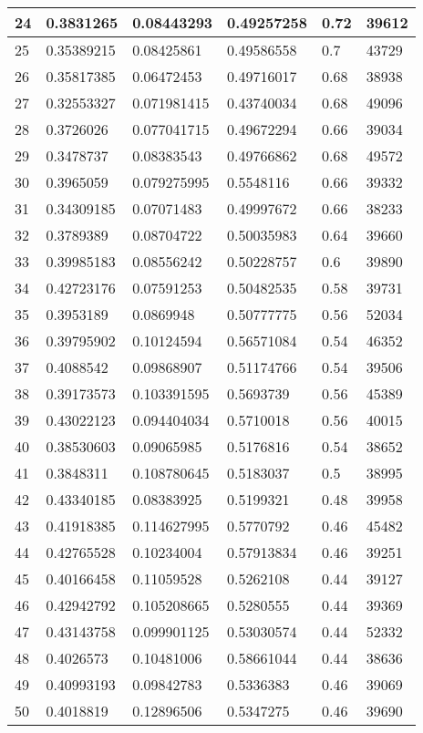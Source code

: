 \begin{longtable}{|l|l|l|l|l|l|}
24 & 0.3831265 & 0.08443293 & 0.49257258 & 0.72 & 39612 \\ \hline 
25 & 0.35389215 & 0.08425861 & 0.49586558 & 0.7 & 43729 \\ \hline 
26 & 0.35817385 & 0.06472453 & 0.49716017 & 0.68 & 38938 \\ \hline 
27 & 0.32553327 & 0.071981415 & 0.43740034 & 0.68 & 49096 \\ \hline 
28 & 0.3726026 & 0.077041715 & 0.49672294 & 0.66 & 39034 \\ \hline 
29 & 0.3478737 & 0.08383543 & 0.49766862 & 0.68 & 49572 \\ \hline 
30 & 0.3965059 & 0.079275995 & 0.5548116 & 0.66 & 39332 \\ \hline 
31 & 0.34309185 & 0.07071483 & 0.49997672 & 0.66 & 38233 \\ \hline 
32 & 0.3789389 & 0.08704722 & 0.50035983 & 0.64 & 39660 \\ \hline 
33 & 0.39985183 & 0.08556242 & 0.50228757 & 0.6 & 39890 \\ \hline 
34 & 0.42723176 & 0.07591253 & 0.50482535 & 0.58 & 39731 \\ \hline 
35 & 0.3953189 & 0.0869948 & 0.50777775 & 0.56 & 52034 \\ \hline 
36 & 0.39795902 & 0.10124594 & 0.56571084 & 0.54 & 46352 \\ \hline 
37 & 0.4088542 & 0.09868907 & 0.51174766 & 0.54 & 39506 \\ \hline 
38 & 0.39173573 & 0.103391595 & 0.5693739 & 0.56 & 45389 \\ \hline 
39 & 0.43022123 & 0.094404034 & 0.5710018 & 0.56 & 40015 \\ \hline 
40 & 0.38530603 & 0.09065985 & 0.5176816 & 0.54 & 38652 \\ \hline 
41 & 0.3848311 & 0.108780645 & 0.5183037 & 0.5 & 38995 \\ \hline 
42 & 0.43340185 & 0.08383925 & 0.5199321 & 0.48 & 39958 \\ \hline 
43 & 0.41918385 & 0.114627995 & 0.5770792 & 0.46 & 45482 \\ \hline 
44 & 0.42765528 & 0.10234004 & 0.57913834 & 0.46 & 39251 \\ \hline 
45 & 0.40166458 & 0.11059528 & 0.5262108 & 0.44 & 39127 \\ \hline 
46 & 0.42942792 & 0.105208665 & 0.5280555 & 0.44 & 39369 \\ \hline 
47 & 0.43143758 & 0.099901125 & 0.53030574 & 0.44 & 52332 \\ \hline 
48 & 0.4026573 & 0.10481006 & 0.58661044 & 0.44 & 38636 \\ \hline 
49 & 0.40993193 & 0.09842783 & 0.5336383 & 0.46 & 39069 \\ \hline 
50 & 0.4018819 & 0.12896506 & 0.5347275 & 0.46 & 39690 \\ \hline 
\end{longtable}